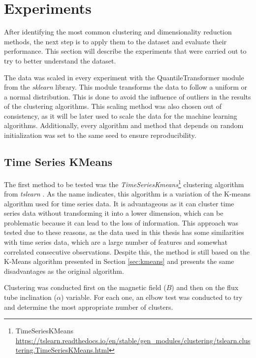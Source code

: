 \section{Experiments}\label{sec:clustering_experiments}
After identifying the most common clustering and dimensionality reduction methods, the next step is to apply them to the dataset and evaluate their performance. This section will describe the experiments that were carried out to try to better understand the dataset. 

The data was scaled in every experiment with the QuantileTransformer module from the \textit{sklearn} \cite{scikit-learn} library. This module transforms the data to follow a uniform or a normal distribution. This is done to avoid the influence of outliers in the results of the clustering algorithms. This scaling method was also chosen out of consistency, as it will be later used to scale the data for the machine learning algorithms. Additionally, every algorithm and method that depends on random initialization was set to the same seed to ensure reproducibility.

\subsection{Time Series KMeans}\label{sec:time_series_methods}
The first method to be tested was the \textit{TimeSeriesKmeans}\footnote{TimeSeriesKMeans \url{https://tslearn.readthedocs.io/en/stable/gen_modules/clustering/tslearn.clustering.TimeSeriesKMeans.html}} clustering algorithm from \textit{tslearn} \cite{tslearn}. As the name indicates, this algorithm is a variation of the K-means algorithm used for time series data. It is advantageous as it can cluster time series data without transforming it into a lower dimension, which can be problematic because it can lead to the loss of information. This approach was tested due to these reasons, as the data used in this thesis has some similarities with time series data, which are a large number of features and somewhat correlated consecutive observations. Despite this, the method is still based on the K-Means algorithm presented in Section \ref{sec:kmeans} and presents the same disadvantages as the original algorithm. 

Clustering was conducted first on the magnetic field ($B$) and then on the flux tube inclination ($\alpha$) variable. For each one, an elbow test was conducted to try and determine the most appropriate number of clusters. 

